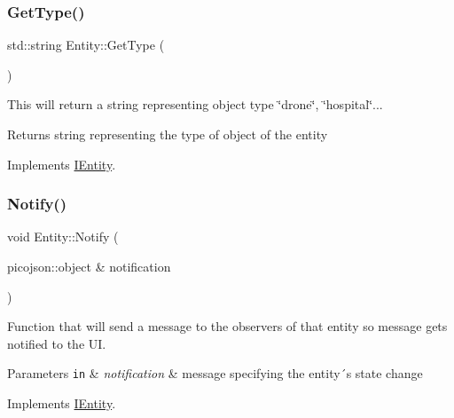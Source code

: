 \subsubsection{\texorpdfstring{Get\+Type()}{GetType()}}
{\footnotesize\ttfamily std\+::string Entity\+::\+Get\+Type (\begin{DoxyParamCaption}{ }\end{DoxyParamCaption})\hspace{0.3cm}{\ttfamily [virtual]}}



This will return a string representing object type \char`\"{}drone\char`\"{}, \char`\"{}hospital\char`\"{}... 

\begin{DoxyReturn}{Returns}
string representing the type of object of the entity 
\end{DoxyReturn}


Implements \hyperlink{classIEntity_ac494bb9712d5a03495a1a95afdbd7153}{I\+Entity}.

\mbox{\label{classEntity_a9e180b76d5dfa6652edcffaf0aea5ec0}} 
\subsubsection{\texorpdfstring{Notify()}{Notify()}}
{\footnotesize\ttfamily void Entity\+::\+Notify (\begin{DoxyParamCaption}\item[{picojson\+::object \&}]{notification }\end{DoxyParamCaption})\hspace{0.3cm}{\ttfamily [virtual]}}



Function that will send a message to the observers of that entity so message gets notified to the UI. 


\begin{DoxyParams}[1]{Parameters}
\mbox{\tt in}  & {\em notification} & message specifying the entity´s state change \\
\hline
\end{DoxyParams}


Implements \hyperlink{classIEntity_acd19cac6fe0e65495f80d1962320e0c3}{I\+Entity}.

\mbox{\label{classEntity_abc90e1d87db431ddbabc81776d8bfb04}} 
